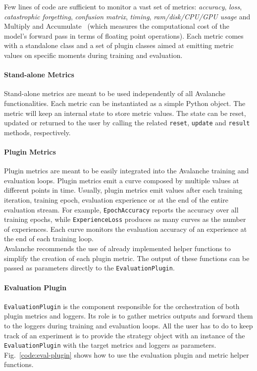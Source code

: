 \documentclass[final]{cvpr}
\theoremstyle{definition}
\newcommand{\codeinline}[1]{\texttt{#1}}
\begin{document}
Few lines of code are sufficient to monitor a vast set of metrics: \textit{accuracy}, \textit{loss}, \textit{catastrophic forgetting}, \textit{confusion matrix}, \textit{timing}, \textit{ram/disk/CPU/GPU usage} and Multiply and Accumulate~\cite{jeangoudoux2018} (which measures the computational cost of the model's forward pass in terms of floating point operations).
Each metric comes with a standalone class and a set of plugin classes aimed at emitting metric values on specific moments during training and evaluation.

\paragraph{Stand-alone Metrics}
Stand-alone metrics are meant to be used independently of all Avalanche functionalities. Each metric can be instantiated as a simple Python object.  The metric will keep an internal state to store metric values. The state can be reset, updated or returned to the user by calling the related \codeinline{reset}, \codeinline{update} and \codeinline{result} methods, respectively.

\paragraph{Plugin Metrics}
Plugin metrics are meant to be easily integrated into the Avalanche training and evaluation loops. Plugin metrics emit a curve composed by multiple values at different points in time. Usually, plugin metrics emit values after each training iteration, training epoch, evaluation experience or at the end of the entire evaluation stream. For example, \codeinline{EpochAccuracy} reports the accuracy over all training epochs, while \codeinline{ExperienceLoss} produces as many curves as the number of experiences. Each curve monitors the evaluation accuracy of an experience at the end of each training loop. \\ 
Avalanche recommends the use of already implemented helper functions to simplify the creation of each plugin metric. The output of these functions can be passed as parameters directly to the \codeinline{EvaluationPlugin}.

\paragraph{Evaluation Plugin}
\codeinline{EvaluationPlugin} is the component responsible for the orchestration of both plugin metrics and loggers. Its role is to gather metrics outputs and forward them to the loggers during training and evaluation loops. All the user has to do to keep track of an experiment is to provide the strategy object with an instance of the \codeinline{EvaluationPlugin} with the target metrics and loggers as parameters. Fig.~\ref{code:eval-plugin} shows how to use the evaluation plugin and metric helper functions. \\ 
\end{document}

